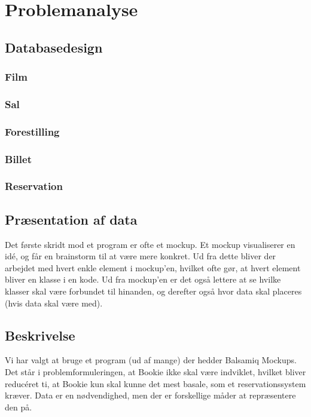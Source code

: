 \chapter{Problemanalyse}

\section{Databasedesign}

\subsection{Film}

\subsection{Sal}

\subsection{Forestilling}

\subsection{Billet}

\subsection{Reservation}

\section{Præsentation af data}

Det første skridt mod et program er ofte et mockup. Et mockup visualiserer en idé, og får en brainstorm til at være mere konkret. Ud fra dette bliver der arbejdet med hvert enkle element i mockup'en, hvilket ofte gør, at hvert element bliver en klasse i en kode. Ud fra mockup'en er det også lettere at se hvilke klasser skal være forbundet til hinanden, og derefter også hvor data skal placeres (hvis data skal være med).

\section{Beskrivelse}

Vi har valgt at bruge et program (ud af mange) der hedder Balsamiq Mockups.
Det står i problemformuleringen, at Bookie ikke skal være indviklet, hvilket bliver reducéret ti, at Bookie kun skal kunne det mest basale, som et reservationssystem kræver. Data er en nødvendighed, men der er forskellige måder at repræsentere den på.

